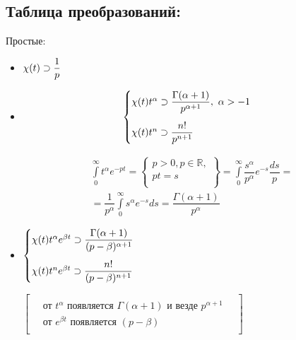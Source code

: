 	 \begin{center}\subsection{Таблица преобразований:}\end{center}
	Простые:
	\begin{itemize}
		\item $\chi(t) \supset \dfrac{1}{p}$
		\item 	
				\begin{minipage}{0.4\textwidth}
					$$
					\begin{cases}
						\hevKul t^{\alpha} \lftKul \dfrac{\Gamma(\alpha+1)}{p^{\alpha+1}},\,\, \alpha > -1 \vspace{3mm}\\
						\hevKul t^{n} \lftKul \dfrac{n!}{p^{n+1}}\,\,
					\end{cases} 
					$$
				\end{minipage}
					\hfill
				\begin{minipage}{0.5\textwidth}
						$$
						\begin{gathered}
							\int\limits^{\infty}_{0} t^{\alpha}e^{-pt} = 
					 							\begin{Bmatrix}	
													p>0, p\in \mathbb{R}, \\
													 pt = s\\
												\end{Bmatrix} = 
												\int\limits^{\infty}_{0} \dfrac{s^{\alpha}}{p^{\alpha}}e^{-s}\dfrac{ds}{p} =\\
												=\dfrac{1}{p^{\alpha}} \int\limits^{\infty}_{0} s^{\alpha} e^{-s} ds 
												= \dfrac{\Gamma(\alpha+1)}{p^{\alpha}}
						\end{gathered}
						$$
				\end{minipage}
		\item 
				\begin{minipage}{0.4\textwidth}
					$
					\begin{cases}
						\hevKul t^{\alpha}e^{\beta t} \lftKul 
									\dfrac{\Gamma(\alpha+1)}{(p-\beta)^{\alpha+1}} \vspace{3mm}\\
						\hevKul t^{n}e^{\beta t} \lftKul \dfrac{n!}{(p-\beta)^{n+1}}\,\
					\end{cases} 
					$
				\end{minipage}
					\hfill
				\begin{minipage}{0.5\textwidth}
					 $\left[ \quad \begin{gathered}
					 				\\
					 				\text{от $t^\alpha$ появляется $\Gamma(\alpha+1)$ и везде $p^{\alpha+1}$} \\
					 				\text{от $e^{\beta t}$ появляется $(p-\beta)$}
					 				\\ \,
					 			\end{gathered} \quad
					 	\right]$
				\end{minipage}				 	
	\end{itemize}
